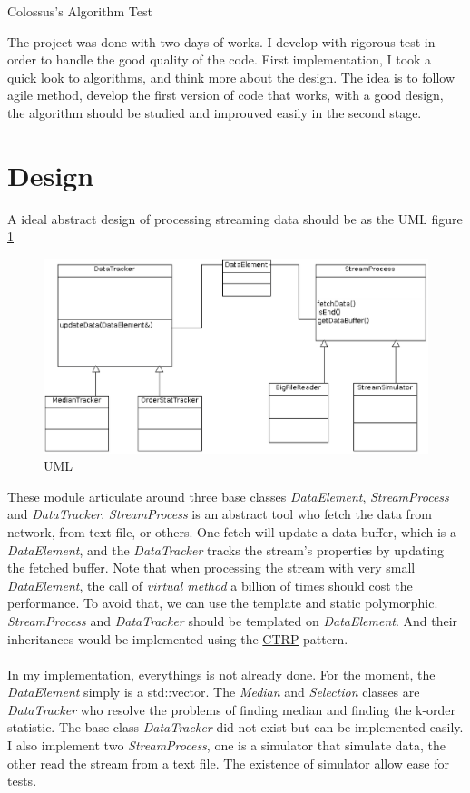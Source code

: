 \documentclass[a4paper,10pt]{article}
\begin{document}
\begin{center}
Colossus's Algorithm Test 
\end{center}
The project was done with two days of works. I develop with rigorous test in order to handle the good quality of the code. First implementation, I took a quick look to algorithms, and think more about the design. The idea is to follow agile method, develop the first version of code that works, with a good design, the algorithm should be studied and improuved easily in the second stage. 
\section{Design} 
A ideal abstract design of processing streaming data should be as the UML figure \ref{fig:uml}
\begin {figure}[h]
\begin{center}
\includegraphics[scale=0.4]{ClassDiagram}
\caption{\label{fig:uml}UML}
\end{center}
\end {figure}
These module articulate around three base classes \textit{DataElement}, \textit{StreamProcess} and \textit{DataTracker}. \textit{StreamProcess} is an abstract tool who fetch the data from network, from text file, or others. One fetch will update a data buffer, which is a \textit{DataElement}, and the \textit{DataTracker} tracks the stream's properties by updating the fetched buffer. Note that when processing the stream with very small \textit{DataElement}, the call of \textit{virtual method} a billion of times should cost the performance. To avoid that, we can use the template and static polymorphic. \textit{StreamProcess} and \textit{DataTracker} should be templated on \textit{DataElement}. And their inheritances would be implemented using the \href{http://en.wikipedia.org/wiki/Curiously_recurring_template_pattern}{CTRP} pattern.      
\paragraph{} In my implementation, everythings is not already done. For the moment, the \textit{DataElement} simply is a std::vector. The \textit{Median} and \textit{Selection} classes are \textit{DataTracker} who resolve the problems of finding median and finding the k-order statistic. The base class \textit{DataTracker} did not exist but can be implemented easily. I also implement two \textit{StreamProcess}, one is a simulator that simulate data, the other read the stream from a text file. The existence of simulator allow ease for tests.
\end{document}
